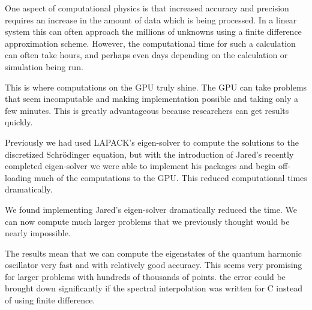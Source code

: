 \documentclass{report}
\theoremstyle{definition}
\begin{document}
One aspect of computational physics is that increased accuracy and precision requires an increase in the amount of data which is being processed. In a linear system this can often approach the millions of unknowns using a finite difference approximation scheme. However, the computational time for such a calculation can often take hours, and perhaps even days depending on the calculation or simulation being run. 


This is where computations on the GPU truly shine. The GPU can take problems that seem incomputable and making implementation possible and taking only a few minutes. This is greatly advantageous because researchers can get results quickly. 

Previously we had used LAPACK's eigen-solver to compute the solutions to the discretized Schr\"odinger equation, but with the introduction of Jared's recently completed eigen-solver we were able to implement his packages and begin off-loading much of the computations to the GPU. This reduced computational times dramatically. 






We found implementing Jared's eigen-solver dramatically reduced the time. We can now compute much larger problems that we previously thought would be nearly impossible. 




The results mean that we can compute the eigenstates of the quantum harmonic oscillator very fast and with relatively good accuracy. This seems very promising for larger problems with hundreds of thousands of points. the error could be brought down significantly if the spectral interpolation was written for C instead of using finite difference. 
\end{document}
